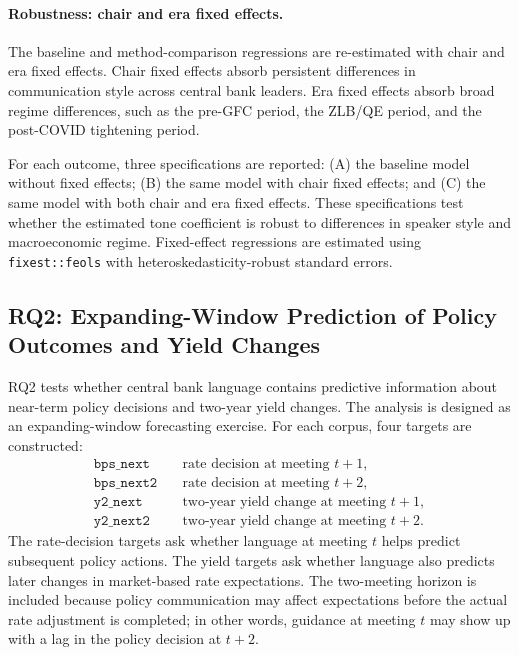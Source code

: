 \paragraph{Robustness: chair and era fixed effects.}
The baseline and method-comparison regressions are re-estimated with chair and
era fixed effects. Chair fixed effects absorb persistent differences in
communication style across central bank leaders. Era fixed effects absorb
broad regime differences, such as the pre-GFC period, the ZLB/QE period, and the
post-COVID tightening period.

For each outcome, three specifications are reported: (A) the baseline model
without fixed effects; (B) the same model with chair fixed effects; and (C) the
same model with both chair and era fixed effects. These specifications test
whether the estimated tone coefficient is robust to differences in speaker style
and macroeconomic regime. Fixed-effect regressions are estimated using
\texttt{fixest::feols} with heteroskedasticity-robust standard errors.



\subsection{RQ2: Expanding-Window Prediction of Policy Outcomes and Yield Changes}
\label{sec:meth_rq2}

RQ2 tests whether central bank language contains predictive information about
near-term policy decisions and two-year yield changes. The analysis is designed
as an expanding-window forecasting exercise. For each corpus, four targets are
constructed:
%
\begin{align*}
  \texttt{bps\_next}  &\quad \text{rate decision at meeting } t+1,\\
  \texttt{bps\_next2} &\quad \text{rate decision at meeting } t+2,\\
  \texttt{y2\_next}   &\quad \text{two-year yield change at meeting } t+1,\\
  \texttt{y2\_next2}  &\quad \text{two-year yield change at meeting } t+2.
\end{align*}
%
The rate-decision targets ask whether language at meeting \(t\) helps predict
subsequent policy actions. The yield targets ask whether language also predicts
later changes in market-based rate expectations. The two-meeting horizon is
included because policy communication may affect expectations before the actual
rate adjustment is completed; in other words, guidance at meeting \(t\) may
show up with a lag in the policy decision at \(t+2\).

